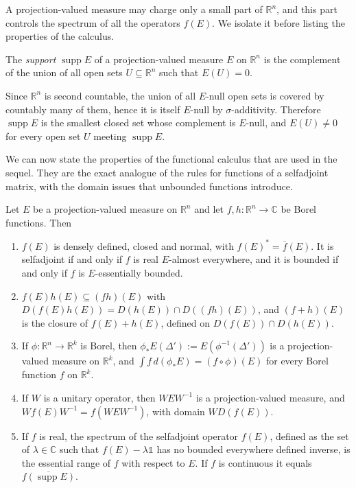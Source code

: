 A projection-valued measure may charge only a small part of $\mathbb{R}^n$, and this part controls the spectrum of all the operators $f(E)$. We isolate it before listing the properties of the calculus.

\begin{definition}\label{def:pvm-support}
	The \emph{support} $\operatorname{supp}E$ of a projection-valued measure $E$ on $\mathbb{R}^n$ is the complement of the union of all open sets $U\subseteq\mathbb{R}^n$ such that $E(U)=0$.
\end{definition}

\begin{remark}
	Since $\mathbb{R}^n$ is second countable, the union of all $E$-null open sets is covered by countably many of them, hence it is itself $E$-null by $\sigma$-additivity. Therefore $\operatorname{supp}E$ is the smallest closed set whose complement is $E$-null, and $E(U)\neq0$ for every open set $U$ meeting $\operatorname{supp}E$.
\end{remark}

We can now state the properties of the functional calculus that are used in the sequel. They are the exact analogue of the rules for functions of a selfadjoint matrix, with the domain issues that unbounded functions introduce.

\begin{proposition}\label{prop:pvm-calculus}
	Let $E$ be a projection-valued measure on $\mathbb{R}^n$ and let $f,h:\mathbb{R}^n\to\mathbb{C}$ be Borel functions. Then
	\begin{enumerate}
		\item $f(E)$ is densely defined, closed and normal, with $f(E)^*=\overline{f}(E)$. It is selfadjoint if and only if $f$ is real $E$-almost everywhere, and it is bounded if and only if $f$ is $E$-essentially bounded.
		\item $f(E)h(E)\subseteq(fh)(E)$ with $D(f(E)h(E))=D(h(E))\cap D((fh)(E))$, and $(f+h)(E)$ is the closure of $f(E)+h(E)$, defined on $D(f(E))\cap D(h(E))$.
		\item If $\phi:\mathbb{R}^n\to\mathbb{R}^k$ is Borel, then $\phi_*E(\Delta'):=E(\phi^{-1}(\Delta'))$ is a projection-valued measure on $\mathbb{R}^k$, and $\int f\,d(\phi_*E)=(f\circ\phi)(E)$ for every Borel function $f$ on $\mathbb{R}^k$.
		\item If $W$ is a unitary operator, then $WEW^{-1}$ is a projection-valued measure, and $Wf(E)W^{-1}=f(WEW^{-1})$, with domain $WD(f(E))$.
		\item If $f$ is real, the spectrum of the selfadjoint operator $f(E)$, defined as the set of $\lambda\in\mathbb{C}$ such that $f(E)-\lambda\mathbb{1}$ has no bounded everywhere defined inverse, is the essential range of $f$ with respect to $E$. If $f$ is continuous it equals $\overline{f(\operatorname{supp}E)}$.
	\end{enumerate}
\end{proposition}

